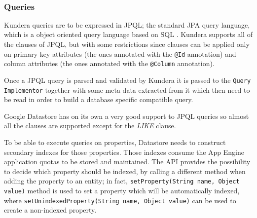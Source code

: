\begin{table}[ht]
\small
\centering
{}
\\
\caption{Mapping of entity fields on Google Datastore}
\label{table:gae-mapping}
\end{table}

\subsubsection{Queries}
Kundera queries are to be expressed in JPQL; the standard JPA query language, which is a  object oriented query language based on SQL \cite{book:projpa2}.
Kundera supports all of the clauses of JPQL, but with some restrictions since clauses can be applied only on primary key attributes (the ones annotated with the \texttt{@Id} annotation) and column attributes (the ones annotated with the \texttt{@Column} annotation).

\noindent Once a JPQL query is parsed and validated by Kundera it is passed to the \texttt{Query Implementor} together with some meta-data extracted from it which then need to be read in order to build a database specific compatible query.
    
\newparagraph Google Datastore has on its own a very good support to JPQL queries so almost all the clauses are supported except for the \textit{LIKE} clause.

\noindent To be able to execute queries on properties, Datastore needs to construct secondary indexes for those properties. Those indexes consume the App Engine application quotas to be stored and maintained. The API provides the possibility to decide which property should be indexed, by calling a different method when adding the property to an entity; in fact, \texttt{setProperty(String name, Object value)} method is used to set a property which will be automatically indexed, where \texttt{setUnindexedProperty(String name, Object value)} can be used to create a non-indexed property.

